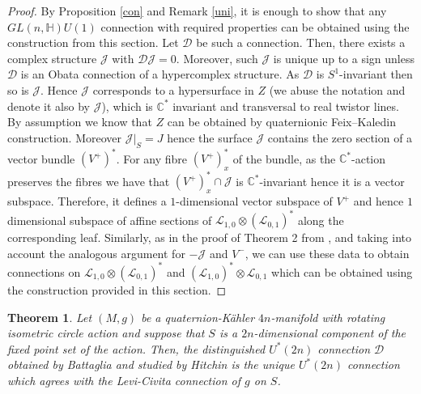 \documentclass{amsart}
\newtheorem{thm}{Theorem}[section]
\begin{document}
\begin{proof}
By Proposition \ref{con} and Remark \ref{uni}, it is enough to show that any $GL(n,\mathbb{H})U(1)$ connection with required properties can be obtained using the construction from this section. Let $\mathcal{D}$ be such a connection. Then, there exists a complex structure $\mathcal{J}$ with $\mathcal{D}\mathcal{J}=0$. Moreover, such $\mathcal{J}$ is unique up to a sign unless $\mathcal{D}$ is an Obata connection of a hypercomplex structure. As $\mathcal{D}$ is $S^1$-invariant then so is $\mathcal{J}$. Hence $\mathcal{J}$ corresponds to a hypersurface in $Z$ (we abuse the notation and denote it also by $\mathcal{J}$), which is $\mathbb{C}^*$ invariant and transversal to real twistor lines. By assumption we know that $Z$ can be obtained by quaternionic Feix--Kaledin construction. Moreover $\mathcal{J}|_S=J$ hence the surface $\mathcal{J}$ contains the zero section of a vector bundle $(V^+)^*$. For any fibre $(V^+)^*_x$ of the bundle, as the $\mathbb{C}^*$-action preserves the fibres we have that  $(V^+)^*_x\cap\mathcal{J}$ is $\mathbb{C}^*$-invariant hence it is a vector subspace. Therefore, it defines a $1$-dimensional vector subspace of $V^+$ and hence $1$ dimensional subspace of affine sections of $\mathcal{L}_{1,0}\otimes(\mathcal{L}_{0,1})^*$ along the corresponding leaf. Similarly, as in the proof of Theorem 2 from \cite{Bo}, and taking into account the analogous argument for $-\mathcal{J}$ and $V^-$, we can use these data to obtain connections on $\mathcal{L}_{1,0}\otimes(\mathcal{L}_{0,1})^*$ and $(\mathcal{L}_{1,0})^*\otimes\mathcal{L}_{0,1}$ which can be obtained using the construction provided in this section.
\end{proof}
    \begin{thm}\label{wn}
Let $(M,g)$ be a quaternion-K\"ahler $4n$-manifold with rotating isometric circle action and suppose that $S$ is a $2n$-dimensional component of the fixed point set of the action.  Then, the distinguished $U^*(2n)$ connection $\mathcal{D}$ obtained by Battaglia \cite{Bat} and studied by Hitchin \cite{Hit3} is the unique $U^*(2n)$ connection which agrees with the Levi-Civita connection of $g$ on $S$.
    \end{thm}
\end{document}
